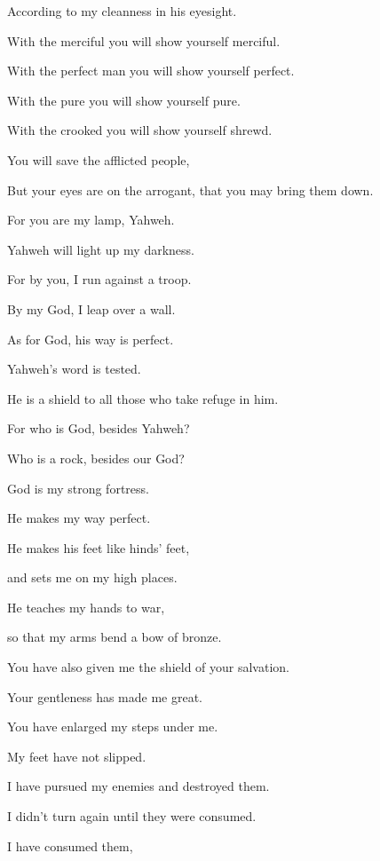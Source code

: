 {\par }{\QB According to my cleanness in his eyesight.
\par }{\Q {}With the merciful you will show yourself merciful.
\par }{\QB With the perfect man you will show yourself perfect.
\par }{\QB {}With the pure you will show yourself pure.
\par }{\QB With the crooked you will show yourself shrewd.
\par }{\Q {}You will save the afflicted people,
\par }{\QB But your eyes are on the arrogant, that you may bring them down.
\par }{\Q {}For you are my lamp, Yahweh.
\par }{\QB Yahweh will light up my darkness.
\par }{\Q {}For by you, I run against a troop.
\par }{\QB By my God, I leap over a wall.
\par }{\Q {}As for God, his way is perfect.
\par }{\QB Yahweh’s word is tested.
\par }{\QB He is a shield to all those who take refuge in him.
\par }{\Q {}For who is God, besides Yahweh?
\par }{\QB Who is a rock, besides our God?
\par }{\Q {}God is my strong fortress.
\par }{\QB He makes my way perfect.
\par }{\Q {}He makes his feet like hinds’ feet,
\par }{\QB and sets me on my high places.
\par }{\Q {}He teaches my hands to war,
\par }{\QB so that my arms bend a bow of bronze.
\par }{\Q {}You have also given me the shield of your salvation.
\par }{\QB Your gentleness has made me great.
\par }{\Q {}You have enlarged my steps under me.
\par }{\QB My feet have not slipped.
\par }{\Q {}I have pursued my enemies and destroyed them.
\par }{\QB I didn’t turn again until they were consumed.
\par }{\Q {}I have consumed them,
}
